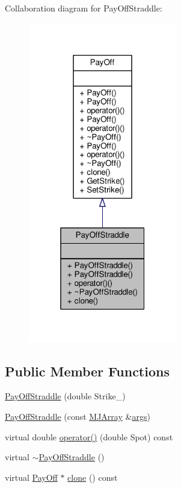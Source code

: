 Collaboration diagram for Pay\+Off\+Straddle\+:
\nopagebreak
\begin{figure}[H]
\begin{center}
\leavevmode
\includegraphics[width=184pt]{classPayOffStraddle__coll__graph}
\end{center}
\end{figure}
\subsection*{Public Member Functions}
\begin{DoxyCompactItemize}
\item 
\hyperlink{classPayOffStraddle_af15fc09a267a262f5be7c7d336a5577d}{Pay\+Off\+Straddle} (double Strike\+\_\+)
\item 
\hyperlink{classPayOffStraddle_a3ef92eb2545ae6651b9ff85759dac1c8}{Pay\+Off\+Straddle} (const \hyperlink{classMJArray}{M\+J\+Array} \&\hyperlink{path__generation_8h_a75c13cde2074f502cc4348c70528572d}{args})
\item 
virtual double \hyperlink{classPayOffStraddle_a28143540c0f8f858d8c00aaea188f4c1}{operator()} (double Spot) const
\item 
virtual \hyperlink{classPayOffStraddle_a444cbd48a0d5b654a9d82f92427fb882}{$\sim$\+Pay\+Off\+Straddle} ()
\item 
virtual \hyperlink{classPayOff}{Pay\+Off} $\ast$ \hyperlink{classPayOffStraddle_a7909db1ef33e12454c02d289d39f667a}{clone} () const
\end{DoxyCompactItemize}
